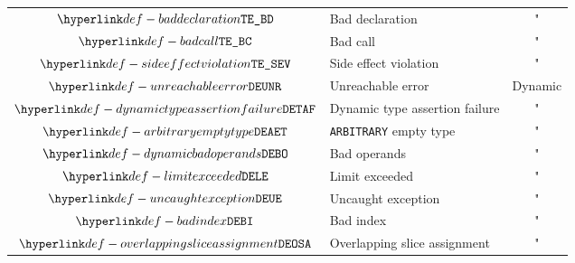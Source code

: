 \begin{center}
\begin{tabular}{clc}
  $\BadDeclaration$              & Bad declaration                & "             \\
  $\BadCall$                     & Bad call                       & "             \\
  $\SideEffectViolation$         & Side effect violation          & "             \\
  \hline
  $\UnreachableError$            & Unreachable error              & Dynamic       \\
  $\DynamicTypeAssertionFailure$ & Dynamic type assertion failure & "             \\
  $\ArbitraryEmptyType$          & \texttt{ARBITRARY} empty type  & "             \\
  $\DynamicBadOperands$          & Bad operands                   & "             \\
  $\LimitExceeded$               & Limit exceeded                 & "             \\
  $\UncaughtException$           & Uncaught exception             & "             \\
  $\BadIndex$                    & Bad index                      & "             \\
  $\OverlappingSliceAssignment$  & Overlapping slice assignment   & "             \\
\end{tabular}
\end{center}

